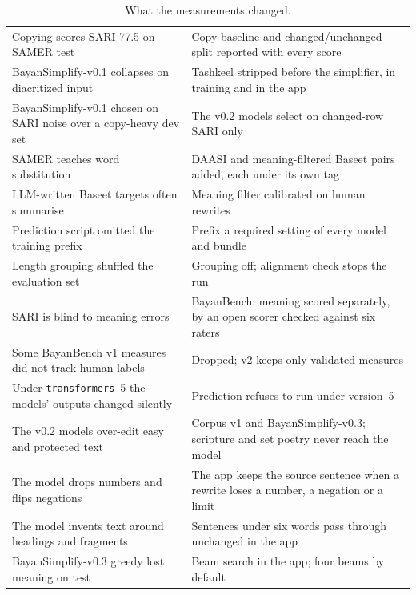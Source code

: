 \documentclass[10pt,a4paper]{article}
\newcommand{\vOne}{BayanSimplify-v0.1}
\newcommand{\vThree}{BayanSimplify-v0.3}
\begin{document}
\begin{table}[h]
\small
\caption{What the measurements changed.}
\label{tab:improvements}
\begin{tabularx}{\linewidth}{|L|L|}
\hline
{} &  \\ \hline
Copying scores SARI 77.5 on SAMER test & Copy baseline and changed/unchanged split reported with every score \\ \hline
\vOne{} collapses on diacritized input & Tashkeel stripped before the simplifier, in training and in the app \\ \hline
\vOne{} chosen on SARI noise over a copy-heavy dev set & The v0.2 models select on changed-row SARI only \\ \hline
SAMER teaches word substitution & DAASI and meaning-filtered Baseet pairs added, each under its own tag \\ \hline
LLM-written Baseet targets often summarise & Meaning filter calibrated on human rewrites \\ \hline
Prediction script omitted the training prefix & Prefix a required setting of every model and bundle \\ \hline
Length grouping shuffled the evaluation set & Grouping off; alignment check stops the run \\ \hline
SARI is blind to meaning errors & BayanBench: meaning scored separately, by an open scorer checked against six raters \\ \hline
Some BayanBench v1 measures did not track human labels & Dropped; v2 keeps only validated measures \\ \hline
Under \texttt{transformers}~5 the models' outputs changed silently & Prediction refuses to run under version~5 \\ \hline
The v0.2 models over-edit easy and protected text & Corpus v1 and \vThree{}; scripture and set poetry never reach the model \\ \hline
The model drops numbers and flips negations & The app keeps the source sentence when a rewrite loses a number, a negation or a limit \\ \hline
The model invents text around headings and fragments & Sentences under six words pass through unchanged in the app \\ \hline
\vThree{} greedy lost meaning on test & Beam search in the app; four beams by default \\ \hline
\end{tabularx}
\end{table}
\end{document}
